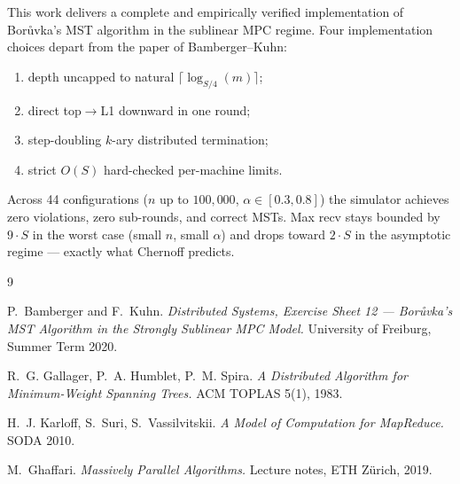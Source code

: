 \documentclass[11pt]{article}
\begin{document}
This work delivers a complete and empirically verified implementation of
Bor\r{u}vka's MST algorithm in the sublinear MPC regime. Four implementation
choices depart from the paper of Bamberger--Kuhn:
\begin{enumerate}[topsep=2pt, itemsep=2pt, leftmargin=*]
    \item depth uncapped to natural $\lceil \log_{S/4}(m) \rceil$;
    \item direct top$\to$L1 downward in one round;
    \item step-doubling $k$-ary distributed termination;
    \item strict $O(S)$ hard-checked per-machine limits.
\end{enumerate}
Across 44 configurations ($n$ up to $100{,}000$, $\alpha \in [0.3, 0.8]$)
the simulator achieves zero violations, zero sub-rounds, and correct MSTs.
Max recv stays bounded by $9 \cdot S$ in the worst case (small $n$, small
$\alpha$) and drops toward $2 \cdot S$ in the asymptotic regime --- exactly
what Chernoff predicts.

\begin{thebibliography}{9}

P.~Bamberger and F.~Kuhn.
\textit{Distributed Systems, Exercise Sheet 12 --- Bor\r{u}vka's MST
Algorithm in the Strongly Sublinear MPC Model.}
University of Freiburg, Summer Term 2020.

R.~G. Gallager, P.~A. Humblet, P.~M. Spira.
\textit{A Distributed Algorithm for Minimum-Weight Spanning Trees.}
ACM TOPLAS 5(1), 1983.

H.~J. Karloff, S.~Suri, S.~Vassilvitskii.
\textit{A Model of Computation for MapReduce.}
SODA 2010.

M.~Ghaffari.
\textit{Massively Parallel Algorithms.}
Lecture notes, ETH Z\"urich, 2019.

\end{thebibliography}
\end{document}
